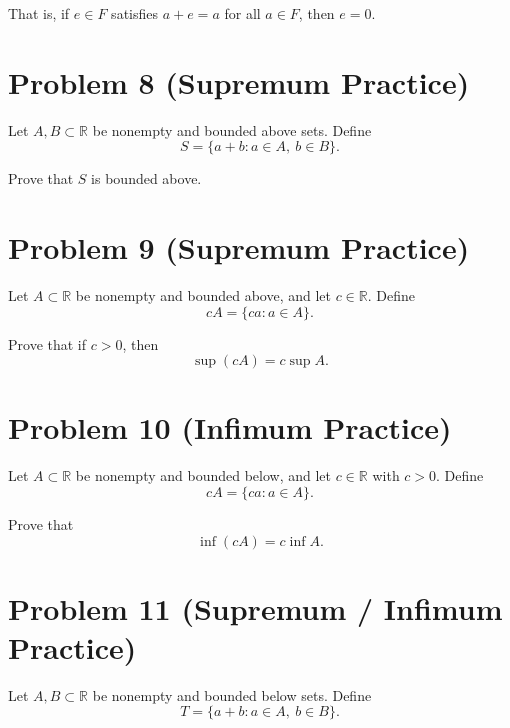 \documentclass[12pt]{article}
\begin{document}
That is, if $e \in F$ satisfies $a + e = a$ for all $a \in F$, then $e = 0$.

\vfill

\newpage

\section*{Problem 8 (Supremum Practice)}

Let $A, B \subset \mathbb{R}$ be nonempty and bounded above sets. Define
\[
S = \{a + b : a \in A,\ b \in B\}.
\]

Prove that $S$ is bounded above.

\vfill

\newpage

\section*{Problem 9 (Supremum Practice)}

Let $A \subset \mathbb{R}$ be nonempty and bounded above, and let $c \in \mathbb{R}$. Define
\[
cA = \{ca : a \in A\}.
\]

Prove that if $c > 0$, then
\[
\sup(cA) = c \sup A.
\]

\vfill

\newpage

\section*{Problem 10 (Infimum Practice)}

Let $A \subset \mathbb{R}$ be nonempty and bounded below, and let $c \in \mathbb{R}$ with $c > 0$. Define
\[
cA = \{ca : a \in A\}.
\]

Prove that
\[
\inf(cA) = c \inf A.
\]

\vfill

\newpage

\section*{Problem 11 (Supremum / Infimum Practice)}

Let $A, B \subset \mathbb{R}$ be nonempty and bounded below sets. Define
\[
T = \{a + b : a \in A,\ b \in B\}.
\]
\end{document}
